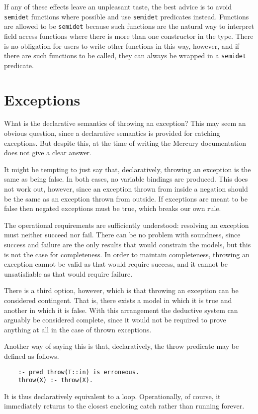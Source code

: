If any of these effects leave an unpleasant taste,
the best advice is to avoid \texttt{semidet} functions where possible
and use \texttt{semidet} predicates instead.
Functions are allowed to be \texttt{semidet}
because such functions are the natural way
to interpret field access functions
where there is more than one constructor in the type.
There is no obligation for users to write other functions in this way,
however,
and if there are such functions to be called,
they can always be wrapped in a \texttt{semidet} predicate.


\section{Exceptions}
\label{sec:exceptions}

What is the declarative semantics of throwing an exception?
This may seem an obvious question,
since a declarative semantics is provided for catching exceptions.
But despite this, at the time of writing
the Mercury documentation does not give a clear answer.

It might be tempting to just say that, declaratively,
throwing an exception is the same as being false.
In both cases, no variable bindings are produced.
This does not work out, however,
since an exception thrown from inside a negation
should be the same as an exception thrown from outside.
If exceptions are meant to be false
then negated exceptions must be true,
which breaks our own rule.

The operational requirements are sufficiently understood:
resolving an exception must neither succeed nor fail.
There can be no problem with soundness,
since success and failure are
the only results that would constrain the models,
but this is not the case for completeness.
In order to maintain completeness,
throwing an exception cannot be valid as that would require success,
and it cannot be unsatisfiable as that would require failure.

There is a third option, however,
which is that throwing an exception
can be considered contingent\label{gi:contingent2}.
That is, there exists a model in which it is true
and another in which it is false.
With this arrangement
the deductive system can arguably be considered complete,
since it would not be required to
prove anything at all in the case of thrown exceptions.

Another way of saying this is that, declaratively,
the throw predicate may be defined as follows.
\begin{verbatim}
    :- pred throw(T::in) is erroneous.
    throw(X) :- throw(X).
\end{verbatim}
It is thus declaratively equivalent to a loop.
Operationally, of course,
it immediately returns to the closest enclosing catch
rather than running forever.

